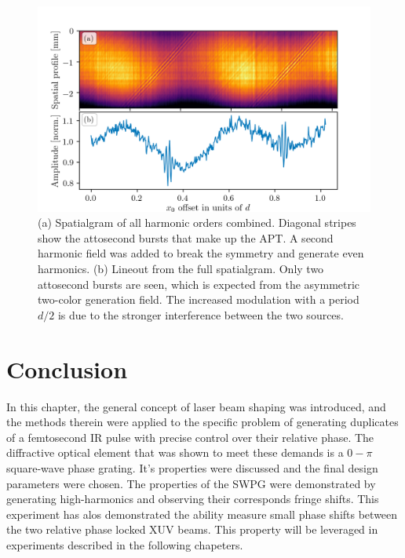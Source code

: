 \begin{figure}
	\centering
	\includegraphics[width=1.0\textwidth]{figures/Two_source/full_spatialgram_w2w.png}
	\caption{(a) Spatialgram of all harmonic orders combined. Diagonal stripes show the attosecond bursts that make up the APT. A second harmonic field was added to break the symmetry and generate even harmonics. (b) Lineout from the full spatialgram.  Only two attosecond bursts are seen, which is expected from the asymmetric two-color generation field.  The increased modulation with a period $d/2$ is due to the stronger interference between the two sources.}
	\label{fig:full_spatialgram_w2w}
\end{figure}

\section{Conclusion}

In this chapter, the general concept of laser beam shaping was introduced, and the methods therein were applied to the specific problem of generating duplicates of a femtosecond IR pulse with precise control over their relative phase. The diffractive optical element that was shown to meet these demands is a $0-\pi$ square-wave phase grating.  It's properties were discussed and the final design parameters were chosen.  The properties of the SWPG were demonstrated by  generating high-harmonics and observing their corresponds fringe shifts.  This experiment has alos demonstrated the ability measure small phase shifts between the two relative phase locked XUV beams.  This property will be leveraged in experiments described in the following chapeters.
